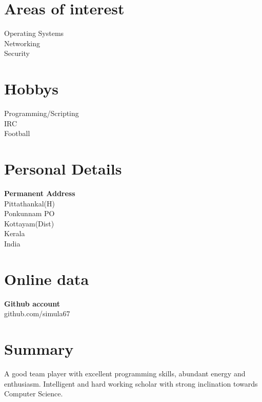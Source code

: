 \documentclass[line,margin]{res}
\begin{document}
\begin{resume}
\section{Areas of interest}
Operating Systems\\
Networking\\
Security\\

\section{Hobbys}
Programming/Scripting\\
IRC\\
Football\\
\section{Personal Details}
{\bf Permanent Address} \\
Pittathankal(H) \\
Ponkunnam PO \\
Kottayam(Dist) \\
Kerala \\
India \\

\section{Online data}
{\bf Github account}\\
github.com/simula67\\
\section{Summary}
A good team player with excellent programming skills, abundant energy and enthusiasm. Intelligent and hard working scholar with strong inclination towards Computer Science.

\end{resume}
\end{document}
